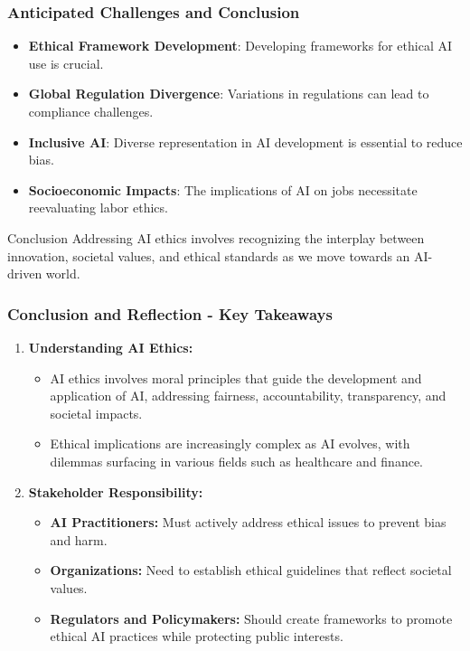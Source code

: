 \documentclass[aspectratio=169]{beamer}
\begin{document}
\begin{frame}[fragile]
    \frametitle{Anticipated Challenges and Conclusion}
    \begin{itemize}
        \item \textbf{Ethical Framework Development}: Developing frameworks for ethical AI use is crucial.
        \item \textbf{Global Regulation Divergence}: Variations in regulations can lead to compliance challenges.
        \item \textbf{Inclusive AI}: Diverse representation in AI development is essential to reduce bias.
        \item \textbf{Socioeconomic Impacts}: The implications of AI on jobs necessitate reevaluating labor ethics.
    \end{itemize}

    \begin{block}{Conclusion}
        Addressing AI ethics involves recognizing the interplay between innovation, societal values, and ethical standards as we move towards an AI-driven world.
    \end{block}
\end{frame}

\begin{frame}[fragile]
  \frametitle{Conclusion and Reflection - Key Takeaways}
  \begin{enumerate}
    \item \textbf{Understanding AI Ethics:}
      \begin{itemize}
        \item AI ethics involves moral principles that guide the development and application of AI, addressing fairness, accountability, transparency, and societal impacts.
        \item Ethical implications are increasingly complex as AI evolves, with dilemmas surfacing in various fields such as healthcare and finance.
      \end{itemize}

    \item \textbf{Stakeholder Responsibility:}
      \begin{itemize}
        \item \textbf{AI Practitioners:} Must actively address ethical issues to prevent bias and harm.
        \item \textbf{Organizations:} Need to establish ethical guidelines that reflect societal values.
        \item \textbf{Regulators and Policymakers:} Should create frameworks to promote ethical AI practices while protecting public interests.
      \end{itemize}
  \end{enumerate}
\end{frame}
\end{document}
